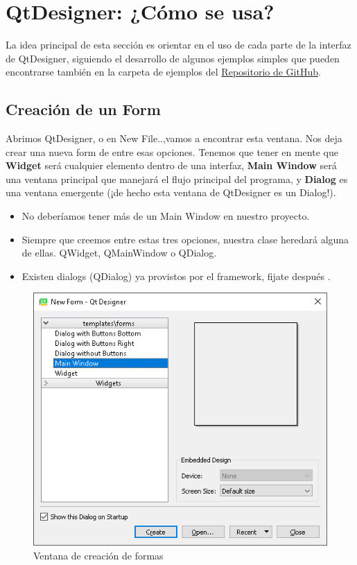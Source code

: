 \section{QtDesigner: ¿C\'omo se usa?}
La idea principal de esta secci\'on es orientar en el uso de cada parte de la interfaz de QtDesigner, siguiendo
el desarrollo de algunos ejemplos simples que pueden encontrarse tambi\'en en la carpeta de ejemplos del \href{https://github.com/nicotrozzo/pyqt5-tutorials}{Repositorio de GitHub}.

\subsection{Creaci\'on de un Form} Abrimos QtDesigner, o en New File..,vamos a encontrar esta ventana. Nos deja crear
una nueva form de entre esas opciones. Tenemos que tener en mente que \textbf{Widget} ser\'a cualquier elemento dentro de una interfaz,
\textbf{Main Window} ser\'a una ventana principal que manejar\'a el flujo principal del programa, y \textbf{Dialog} es una ventana emergente (¡de hecho
esta ventana de QtDesigner es un Dialog!).


\begin{itemize}
    \item No deber\'iamos tener m\'as de un Main Window en nuestro proyecto.
    \item Siempre que creemos entre estas tres opciones, nuestra clase heredar\'a alguna de ellas. QWidget, QMainWindow o QDialog.
    \item Existen dialogs (QDialog) ya provistos por el framework, fijate despu\'es .
\end{itemize}

\begin{figure}[H]
    \centering
    \includegraphics[scale=0.8]{imagenes/qtdesigner/qt_new_file.PNG}
    \caption{Ventana de creaci\'on de formas}
    \label{fig:qt_new_file}
\end{figure}


